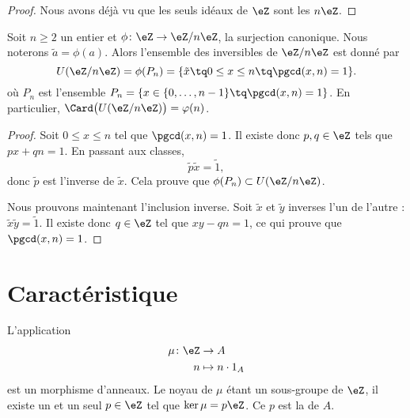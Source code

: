 \begin{proof}
    Nous avons déjà vu que les seuls idéaux de \( \eZ\) sont les \( n\eZ\).
\end{proof}

\begin{proposition}     \label{PropZpintssiprempUzn}
    Soit \( n\geq 2\) un entier et \( \phi\colon \eZ\to \eZ/n\eZ\), la surjection canonique. Nous noterons \( \tilde a=\phi(a)\). Alors l'ensemble des inversibles de \( \eZ/n\eZ\) est donné par
    \begin{equation}
        U(\eZ/n\eZ)=\phi(P_n)=\{ \tilde x\tq 0\leq x\leq n\tq\pgcd(x,n)=1 \}.
    \end{equation}
    où \( P_n\) est l'ensemble $P_n=\{ x\in\{ 0,\ldots,n-1 \}\tq\pgcd(x,n)=1 \}$. En particulier, \( \Card\big( U(\eZ/n\eZ) \big)=\varphi(n)\).
\end{proposition}

\begin{proof}
    Soit \( 0\leq x\leq n\) tel que \( \pgcd(x,n)=1\). Il existe donc \( p,q\in\eZ\) tels que \( px+qn=1\). En passant aux classes,
    \begin{equation}
        \tilde p\tilde x=\tilde 1,
    \end{equation}
    donc \( \tilde p\) est l'inverse de \( \tilde x\). Cela prouve que \( \phi(P_n)\subset U(\eZ/n\eZ)\).

    Nous prouvons maintenant l'inclusion inverse. Soit \( \tilde x\) et \( \tilde y\) inverses l'un de l'autre : $\tilde x\tilde y=\tilde 1$. Il existe donc \( q\in\eZ\) tel que \( xy-qn=1\), ce qui prouve que \( \pgcd(x,n)=1\).
\end{proof}

\section{Caractéristique}

L'application 
\begin{equation}
    \begin{aligned}
        \mu\colon \eZ&\to A \\
        n&\mapsto n\cdot 1_A 
    \end{aligned}
\end{equation}
est un morphisme d'anneaux. Le noyau de \( \mu\) étant un sous-groupe de \( \eZ\), il existe un et un seul \( p\in\eZ\) tel que \( \ker\mu=p\eZ\). Ce \( p\) est la  de \( A\).

